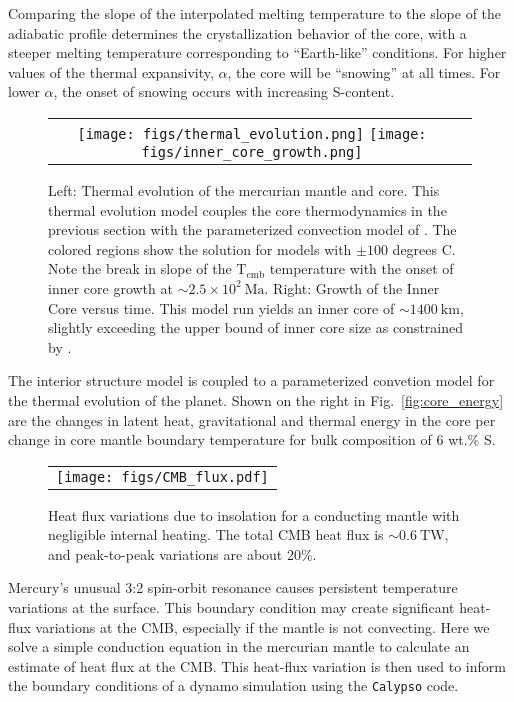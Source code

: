 Comparing the slope of the interpolated melting temperature to the slope of the
adiabatic profile determines the crystallization behavior of the core, with a
steeper melting temperature corresponding to  ``Earth-like'' conditions. For higher
values of the thermal expansivity, $\alpha$, the core will be ``snowing'' at all
times. For lower $\alpha$, the onset of snowing occurs with increasing S-content.


 \begin{figure}[H] %
   \centering
\begin{tabular}{cc}
 \texttt{[image: figs/thermal\_evolution.png]}
 \texttt{[image: figs/inner\_core\_growth.png]}
\end{tabular}
\caption{Left: Thermal evolution of the mercurian mantle and core. This
  thermal evolution model couples the core thermodynamics in the previous section
  with the parameterized convection model of \citep{Stevenson1983}. The colored
  regions show the solution for models with $\pm \mathrm{100}$ degrees C. Note the
  break in slope of the $\mathrm{T_{cmb}}$ temperature with the onset of inner core
  growth at $\sim 2.5\times10^2~\mathrm{Ma}$. Right: Growth of the Inner Core versus
  time. This model run yields an inner core of $ \sim 1400~\mathrm{km}$, slightly
  exceeding the upper bound of inner core size as constrained by \citep{Dumberry2015}.}
  \label{fig:thermal}
\end{figure}

The interior structure model is coupled to a parameterized convetion model for
the thermal evolution of the planet. Shown on the right in Fig.~\ref{fig:core_energy}
are the changes in latent heat, gravitational and thermal energy in the core per
change in core mantle boundary temperature for bulk composition of 6 wt.\% S. 



 \begin{figure}[H] %
   \centering
\begin{tabular}{c}
 \texttt{[image: figs/CMB\_flux.pdf]} 
\end{tabular}
\caption{ Heat flux variations due to insolation for a conducting mantle with negligible internal heating. The total CMB heat flux is $\sim 0.6~\mathrm{TW}$, and peak-to-peak variations are about 20\%. }
\label{fig:flux}
\end{figure}

Mercury's unusual 3:2 spin-orbit resonance causes persistent temperature variations at the surface.  This boundary condition may create significant heat-flux variations at the CMB, especially if the mantle is not convecting.  Here we solve a simple conduction equation in the mercurian mantle to calculate an estimate of heat flux at the CMB.  This heat-flux variation is then used to inform the boundary conditions of a dynamo simulation using the \texttt{Calypso} code.

